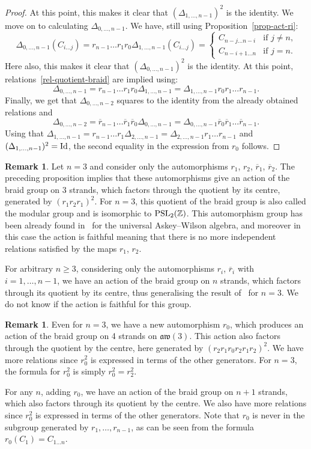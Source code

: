 \documentclass[pdftex]{sigma}
\numberwithin{equation}{section}
\theoremstyle{definition}
\newtheorem{rema}[theo]{Remark}
\newcommand{\rb}{\overline{r}}
\begin{document}
\begin{proof}
At this point, this makes it clear that $(\Delta_{1,\dots,n-1})^2$ is the identity. We move on to calculating $\Delta_{0,\dots,n-1}$. We have, still using Proposition~\ref{prop-act-ri}:
\[\Delta_{0,\dots,n-1} (C_{i\dots j})=r_{n-1}\dots r_1r_0\Delta_{1,\dots,n-1} (C_{i\dots j})=\begin{cases}
C_{n-j\dots n-i} & \text{if $j\neq n$,}\\
C_{n-i+1\dots n} & \text{if $j=n$.}
\end{cases}
\]
Here also, this makes it clear that $(\Delta_{0,\dots,n-1})^2$ is the identity. At this point, relations~\eqref{rel-quotient-braid} are implied using:
\[\Delta_{0,\dots,n-1}=r_{n-1}\dots r_{1}r_{0} \Delta_{1,\dots,n-1}= \Delta_{1,\dots,n-1}r_0r_1\dots r_{n-1} .\]
Finally, we get that $\Delta_{0,\dots,n-2}$ squares to the identity from the already obtained relations and
\[\Delta_{0,\dots,n-2}=\rb_{n-1}\dots \rb_{1}\rb_{0} \Delta_{0,\dots,n-1}= \Delta_{0,\dots,n-1}\rb_0\rb_1\dots \rb_{n-1} .\]
Using that $\Delta_{1,\dots,n-1}=r_{n-1}\dots r_{1} \Delta_{2,\dots,n-1}= \Delta_{2,\dots,n-1}r_1\dots r_{n-1}$ and $(\Delta_{1,\dots,n-1})^2={\rm Id}$, the second equality in the expression from $r_0$ follows.
\end{proof}

\begin{rema}
Let $n=3$ and consider only the automorphisms $r_1$, $r_2$, $\rb_1$, $\rb_2$. The preceding proposition implies that these automorphisms give an action of the braid group on 3 strands,
which factors through the quotient by its centre, generated by $(r_1r_2r_1)^2$.
For $n=3$, this quotient of the braid group is also called the modular group and is isomorphic to ${\rm PSL}_2(\mathbb{Z})$. This automorphism group has been already found in~\cite{Ter} for the universal Askey--Wilson algebra,
and moreover in this case the action is faithful meaning that there is no more independent relations satisfied by the maps $r_1$, $r_2$.

For arbitrary $n\geq 3$, considering only the automorphisms $r_i$, $\rb_i$ with $i=1,\dots,n-1$, we have an action of the braid group on $n$ strands, which factors through its quotient by its centre,
thus generalising the result of~\cite{Ter} for $n=3$. We do not know if the action is faithful for this group.
\end{rema}

\begin{rema}
Even for $n=3$, we have a new automorphism $r_0$, which produces an action of the braid group on 4 strands on $\mathfrak{aw}(3)$.
This action also factors through the quotient by the centre, here generated by $(r_2r_1r_0r_2r_1r_2)^2$.
We have more relations since $r_0^2$ is expressed in terms of the other generators. For $n=3$, the formula for $r_0^2$ is simply $r_0^2=r_2^2$.

For any $n$, adding $r_0$, we have an action of the braid group on $n+1$ strands, which also factors through its quotient by the centre. We also have more relations since $r_0^2$ is expressed in terms of the other generators. Note that $r_0$ is never in the subgroup generated by $r_1,\dots,r_{n-1}$, as can be seen from the formula $r_0(C_1)=C_{1\dots n}$.
\end{rema}
\end{document}
